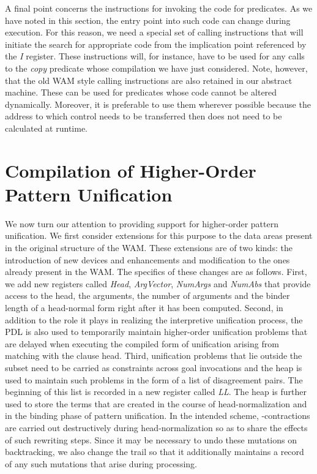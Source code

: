 A final point concerns the instructions for invoking the code
for predicates. As we have noted in this section, the entry
point into such code can change during execution. For this reason, we
need a special set of calling instructions that will
initiate the search for appropriate code from the implication point
referenced by the {\it I} register. These instructions will,
for instance, have to be used for any calls to the {\it copy}
predicate whose compilation we have just considered.
Note, however, that the old WAM style calling instructions are also
retained in our abstract machine. These can be used for predicates
whose code cannot be altered dynamically. Moreover, it is preferable
to use them wherever possible because the address to which control
needs to be transferred then does not need to be calculated at
runtime.

\section{Compilation of Higher-Order Pattern Unification}\label{sec:ho_unif}
We now turn our attention to providing support for higher-order
pattern unification. We first consider extensions for this purpose to
the data areas present in the original structure of the WAM.
These extensions are of two kinds: the introduction of new devices and
enhancements and modification to the ones already present in the WAM.
The specifics of these changes are as follows. First, we add new
registers called {\it Head}, {\it
  ArgVector}, {\it NumArgs} and {\it NumAbs} that provide access to
the head, the arguments, the number of arguments and the binder length
of a head-normal form right after it has been computed.
Second, in addition to the role it plays in realizing the interpretive
unification process,
the PDL is also used to temporarily maintain higher-order unification
problems that are delayed when executing the compiled form of
unification arising from matching with the clause head.
Third, unification problems that lie outside the  subset need to
be carried as constraints across goal invocations and the heap is used
to maintain such problems in the form of a list of disagreement
pairs. The beginning of this list is recorded in a new register called
{\it LL}.
The heap is further used to store the terms that are created in the
course of head-normalization and in the binding phase of pattern
unification.
In the intended scheme, -contractions are carried out
destructively during head-normalization so as to share
the effects of such rewriting steps. Since it may be necessary to undo
these mutations on backtracking, we also change the trail so that it
additionally maintains a record of any such mutations that arise
during processing.

